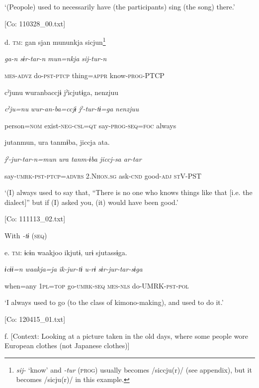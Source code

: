       ‘(Peopole) used to necessarily have (the participants) sing (the song) there.’

      [Co: 110328\_00.txt]

  d.  \textsc{tm}:  gan  sjan  mununkja  sicjun\footnote{\textit{sij-} ‘know’ and \textit{{}-tur} (\textsc{prog}) usually becomes /siccju(r)/ (see appendix), but it becomes /sicju(r)/ in this example.}

      \textit{ga-n}  \textit{sɨr-tar-n}  \textit{mun=nkja}  \textit{sij-tur-n}

      \textsc{mes}-\textsc{advz}  do-\textsc{pst}-\textsc{ptcp}  thing=\textsc{appr}  know-\textsc{prog}-PTCP

      cˀjunu  wuranbaccjɨ  jˀicjutɨga,  {\textbar}nenzjuu{\textbar}

      \textit{cˀju=nu}  \textit{wur-an-ba=ccjɨ}  \textit{jˀ-tur-tɨ=ga}  \textit{nenzjuu}

      person=\textsc{nom}  exist-\textsc{neg}-\textsc{csl}=\textsc{qt}  say-\textsc{prog}-\textsc{seq}=\textsc{foc}  always

      jutanmun,  ura  tanmɨba,  jiccja  ata.

      \textit{jˀ-jur-tar{}-n=mun  ura  tanm-ɨba  jiccj-sa  ar-tar}

      say-\textsc{umrk}-\textsc{pst}-\textsc{ptcp}=\textsc{advrs}  2.N\textsc{hon}.\textsc{sg}  ask-\textsc{cnd}  good-\textsc{adj}  \textsc{st}V-PST

      ‘(I) always used to say that, “There is no one who knows things like that [i.e. the dialect]” but if (I) asked you, (it) would have been good.’

      [Co: 111113\_02.txt]

  With \textit{{}-tɨ} (\textsc{seq})

  e.  \textsc{tm}:  ɨcɨn  waakjoo  ikjutɨ,  urɨ  sjutassɨga.

      \textit{ɨcɨɨ=n}  \textit{waakja=ja}  \textit{ik-jur-tɨ}  \textit{u-rɨ}  \textit{sɨr-jur-tar-sɨga}

      when=any  1\textsc{pl}=\textsc{top}  go-\textsc{umrk}-\textsc{seq}  \textsc{mes}-\textsc{nls}  do-UMRK-\textsc{pst}-\textsc{pol}

      ‘I always used to go (to the class of kimono-making), and used to do it.’

      [Co: 120415\_01.txt]

  f.  [Context: Looking at a picture taken in the old days, where some people wore European clothes (not Japanese clothes)]

